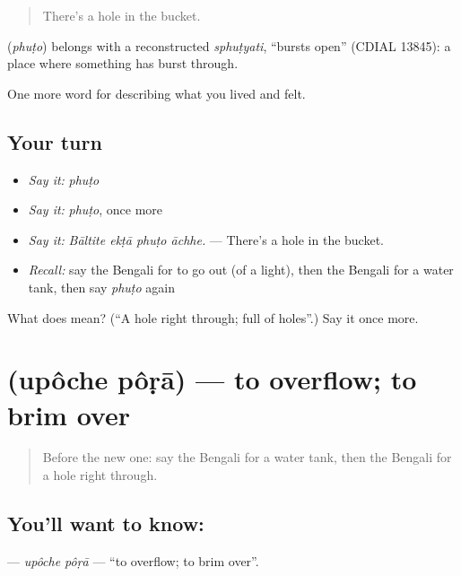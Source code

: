 \begin{quote}
There's a hole in the bucket.
\end{quote}

\begin{cousinweb}
\textbf{} (\emph{phuṭo}) belongs with a reconstructed \emph{sphuṭyati}, \textquotedblleft{}bursts open\textquotedblright{} (CDIAL 13845): a place where something has burst through.
\end{cousinweb}

\begin{grammarlens}[title={What you've built}]
One more word for describing what you lived and felt.
\end{grammarlens}

\subsection*{Your turn}
\begin{itemize}
\raggedright
  \item \emph{Say it:} \emph{phuṭo}
  \item \emph{Say it:} \emph{phuṭo}, once more
  \item \emph{Say it:} \emph{Bāltite ekṭā phuṭo āchhe.} — There's a hole in the bucket.
  \item \emph{Recall:} say the Bengali for to go out (of a light), then the Bengali for a water tank, then say \emph{phuṭo} again
\end{itemize}

\begin{tcolorbox}[breakable,colback=teal!4,colframe=teal!35!black,title={Before you move on}]
What does  mean? (\textquotedblleft{}A hole right through; full of holes\textquotedblright{}.) Say it once more.
\end{tcolorbox}
\section[\texorpdfstring{\bn{উপচে} \bn{পড়া} (upôche pôṛā)}{উপচে পড়া (upôche pôṛā)}]{  (upôche pôṛā) — to overflow; to brim over}

\label{lesson:BN-C506-upoche-pora}



\begin{quote}
Before the new one: say the Bengali for a water tank, then the Bengali for a hole right through.
\end{quote}

\subsection*{You'll want to know:  }
\textbf{ } — \emph{upôche pôṛā} — \textquotedblleft{}to overflow; to brim over\textquotedblright{}.

